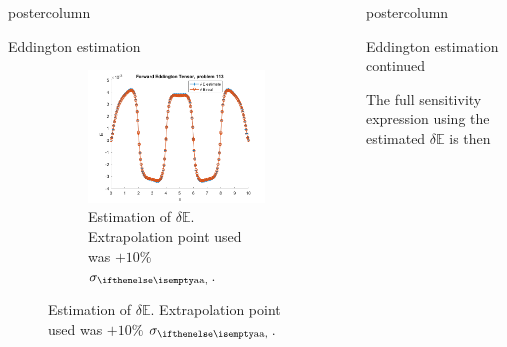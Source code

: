 \documentclass[xcolor={usenames,dvipsnames,svgnames,table}]{beamer}
\newcommand{\Edd}{\mathbb{E}}
\newlength{\columnheight}
\begin{document}
\begin{frame}
\begin{columns}
\begin{column}{.33\textwidth}
\begin{beamercolorbox}[center,wd=\textwidth]{postercolumn}
\begin{minipage}[T]{0.95\textwidth}
{\begin{block}{Eddington estimation}
\begin{figure}[H]
\begin{subfigure}{.33\textwidth}
  \includegraphics[width=.98\linewidth]{113deltaE.png}
    \caption{Estimation of $\delta \Edd$. Extrapolation point used was $+10\%$ $\siga$.}
  \label{fig:sfig5}
\end{subfigure}%
\label{fig:fig}
\end{figure}		     
		    	\vfill
			    \end{block}
			    \vfill
			}
			\end{minipage}
		\end{beamercolorbox}
	\end{column}

	\begin{column}{.33\textwidth}
		\begin{beamercolorbox}[center,wd=\textwidth]{postercolumn}
			\begin{minipage}[T]{0.95\textwidth} %
			\parbox[t][\columnheight]{\textwidth}{ %

			    \begin{block}{Eddington estimation continued}

The full sensitivity expression using the estimated $\delta \Edd$ is then


\end{block}}
\end{minipage}
\end{beamercolorbox}
\end{column}
\end{columns}
\end{frame}
\end{document}
